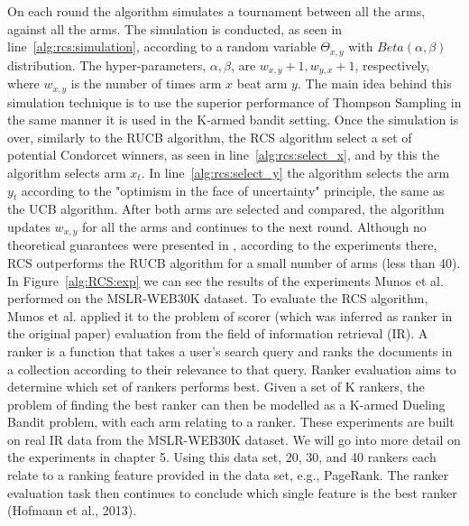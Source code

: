 \documentclass[MSc,beforeExam]{iitcsthesis}
\begin{document}
	On each round the algorithm simulates a tournament between all the arms, against all the arms.
	The simulation is conducted, as seen in line~\ref{alg:rcs:simulation}, according to a random variable $\Theta_{x,y} $ with $Beta(\alpha,\beta)$ distribution. 
	The hyper-parameters, $\alpha,\beta$, are $w_{x,y}+1,w_{y,x}+1$, respectively, where $w_{x,y}$ is the number of times arm $x$ beat arm $y$.
	The main idea behind this simulation technique is to use the superior performance of Thompson Sampling \cite{agrawal2011analysis} in the same manner it is used in the K-armed bandit setting. 
	Once the simulation is over, similarly to the RUCB algorithm, the RCS algorithm select a set of potential Condorcet winners, as seen in line~\ref{alg:rcs:select_x}, and by this the algorithm selects arm $x_t$.
	In line~\ref{alg:rcs:select_y} the algorithm selects the arm $y_t$ according to the "optimism in the face of uncertainty" principle, the same as the UCB algorithm.
	After both arms are selected and compared, the algorithm updates $w_{x,y}$ for all the arms and continues to the next round.
	Although no theoretical guarantees were presented in \cite{zoghi2014relative}, according to the experiments there, RCS outperforms the RUCB algorithm for a small number of arms (less than 40).	
	In Figure~\ref{alg:RCS:exp} we can see the results of the experiments Munos et al. performed on the MSLR-WEB30K dataset.
	To evaluate the RCS algorithm, Munos et al. applied it to the problem of scorer (which was inferred as ranker in the original paper) evaluation from the field of information retrieval (IR). 
	A ranker is a function that takes a user's search query and ranks the documents in a collection according to their relevance to that query. 
	Ranker evaluation aims to determine which set of rankers performs best.
	Given a set of K rankers, the problem of finding the best ranker can then be modelled  as a K-armed Dueling Bandit problem, with each arm relating to a ranker.
	These experiments are built on real IR data from the MSLR-WEB30K dataset.
	We will go into more detail on the experiments in chapter 5.
	Using this data set, 20, 30, and 40 rankers each relate to a ranking feature provided in the data set, e.g., PageRank.
	The ranker evaluation task then continues to conclude which single feature is the best ranker (Hofmann et al., 2013)\cite{hofmann2013fidelity}.
	
\end{document}
